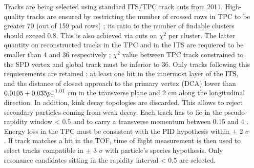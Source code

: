 Tracks are being selected using standard ITS/TPC track cuts from 2011. High-quality tracks are ensured by restricting the number of crossed rows in TPC to be greater 70 (out of 159 pad rows) ; its ratio to the number of findable clusters should exceed 0.8. This is also achieved via cuts on $\chi^2$ per cluster. The latter  quantity on reconstructed tracks in the TPC and in the ITS are requiered to be smaller than 4 and 36 respectively ; $\chi^2$ value between TPC track constrained to the SPD vertex and global track must be inferior to 36. Only tracks following this requierements are retained : at least one hit in the innermost layer of the ITS, and the distance of closest approach to the primary vertex (DCA) lower than $0.0105 + 0.035 p_{\text{\textsc{t}}}^{-1.01}$ cm in the transverse plane and 2 cm along the longitudinal direction. In addition, kink decay topologies are discarded. This allows to reject secondary particles coming from weak decay. Each track has to lie in the pseudo-rapidity window \abspseudorap < 0.5 and to carry a transverse momentum between 0.15 and 4 \gmom. Energy loss in the TPC must be consistent with the PID hypothesis within $\pm$ 2 $\sigma$. If track matches a hit in the TOF, time of flight measurement is then used to select tracks compatible in $\pm$ 3 $\sigma$ with particle's species hypothesis.
Only resonance candidates sitting in the rapidity interval \absrap < 0.5 are selected. 

